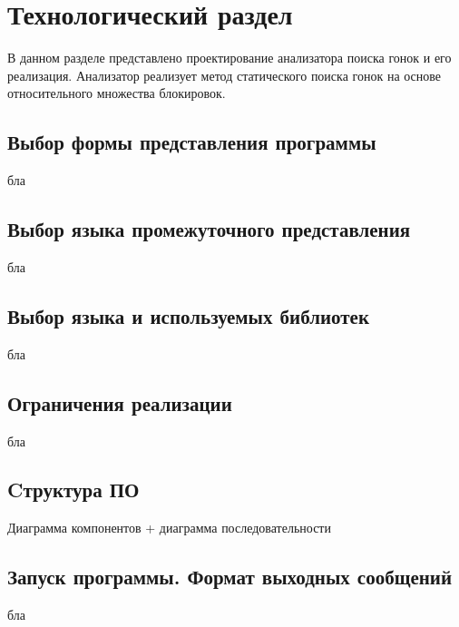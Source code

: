 \chapter{Технологический раздел}
\label{cha:impl}

В данном разделе представлено проектирование анализатора поиска гонок и его реализация. Анализатор реализует метод статического поиска гонок на основе относительного множества блокировок.

\section{Выбор формы представления программы}
бла

\section{Выбор языка промежуточного представления}
бла

\section{Выбор языка и используемых библиотек}
бла

\section{Ограничения реализации}
бла

\section{Cтруктура ПО}
Диаграмма компонентов + диаграмма последовательности

\section{Запуск программы. Формат выходных сообщений}
бла
